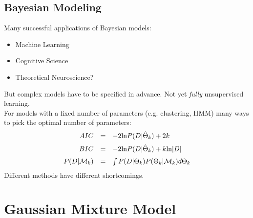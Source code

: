 \documentclass{beamer}
\begin{document}
\subsection{Bayesian Modeling}
\begin{frame}

	Many successful applications of Bayesian models:
	\begin{itemize}
		\item{Machine Learning}
		\item{Cognitive Science}
		\item{Theoretical Neuroscience?}
	\end{itemize}
	But complex models have to be specified in advance.  Not yet {\em fully} unsupervised learning. \bigskip\\

	For models with a fixed number of parameters (e.g. clustering, HMM) many ways to pick the optimal number of parameters:
		\[
		\begin{array}{rcl}
			AIC & = & - 2 \text{ln}P(D|\hat{\Theta}_k) + 2k \medskip\\
			BIC & = & - 2 \text{ln}P(D|\hat{\Theta}_k) + k\text{ln}|D| \medskip\\
			P(D|\mathcal{M}_k) & = & \int  P(D|\Theta_k)P(\Theta_k|\mathcal{M}_k)d\Theta_k\\
		\end{array}
		\]
	Different methods have different shortcomings.

\end{frame}

\section{Gaussian Mixture Model}
\end{document}
